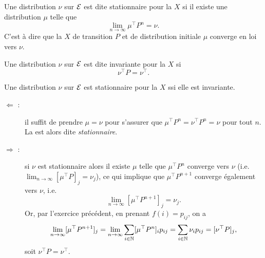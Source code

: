 \begin{definition}
  Une distribution $\nu$ sur $\mathcal{E}$ est dite stationnaire pour la \cM $X$ si il existe une distribution $\mu$ telle que 
  $$
  \lim_{n \rightarrow \infty} \mu^\top P^n = \nu.
  $$
  C'est à dire que la \cM $X$ de transition $P$ et de distribution initiale $\mu$ converge en loi vers $\nu$.
\end{definition}

\begin{definition}
  Une distribution $\nu$ sur $\mathcal{E}$ est dite invariante pour la \cM $X$ si 
  $$
  \nu^\top P = \nu^\top.
  $$
\end{definition}

\begin{proposition} \label{prop:stationnaireInvariante}
  Une distribution $\nu$ sur $\mathcal{E}$ est stationnaire pour la \cM $X$ ssi elle est invariante.
\end{proposition}

\proof
\begin{description}
  \item[$\Leftarrow$ :] il suffit de prendre $\mu = \nu$ pour s'assurer que $\mu^\top P^n = \nu^\top P^n = \nu$ pour tout $n$. La \cM est alors dite {\em stationnaire}.
  \item[$\Rightarrow$ :] si $\nu$ est stationnaire alors il existe $\mu$ telle que $\mu^\top P^n$ converge vers $\nu$ (i.e. $\lim_{n \rightarrow \infty} [\mu^\top P]_j = \nu_j$), ce qui implique que $\mu^\top P^{n+1}$ converge également vers $\nu$, i.e.
  $$
  \lim_{n \rightarrow \infty} [\mu^\top P^{n+1}]_j = \nu_j.
  $$
  Or, par l'exercice précédent, en prenant $f(i) = p_{ij}$, on a
  $$
  \lim_{n \rightarrow \infty} [\mu^\top P^{n+1}]_j
  = \lim_{n \rightarrow \infty} \sum_{i \in \mathbb{N}} [\mu^\top P^n]_i p_{ij}
  = \sum_{i \in \mathbb{N}} \nu_i p_{ij}
  = [\nu^\top P]_j,
  $$
  soit $\nu^\top P = \nu^\top$.
\end{description}
\eproof


